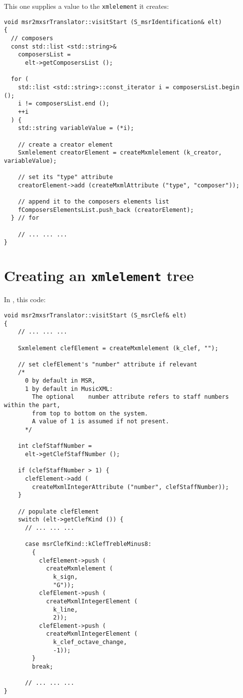This one supplies a value to the {\tt xmlelement} it creates:
\begin{lstlisting}[language=CPlusPlus]
void msr2mxsrTranslator::visitStart (S_msrIdentification& elt)
{
  // composers
  const std::list <std::string>&
    composersList =
      elt->getComposersList ();

  for (
    std::list <std::string>::const_iterator i = composersList.begin ();
    i != composersList.end ();
    ++i
  ) {
    std::string variableValue = (*i);

    // create a creator element
    Sxmlelement creatorElement = createMxmlelement (k_creator, variableValue);

    // set its "type" attribute
    creatorElement->add (createMxmlAttribute ("type", "composer"));

    // append it to the composers elements list
    fComposersElementsList.push_back (creatorElement);
  } // for

	// ... ... ...
}
\end{lstlisting}


\section{Creating an {\tt xmlelement} tree}

In {\tt }, this code:
\begin{lstlisting}[language=CPlusPlus]
void msr2mxsrTranslator::visitStart (S_msrClef& elt)
{
    // ... ... ...

    Sxmlelement clefElement = createMxmlelement (k_clef, "");

    // set clefElement's "number" attribute if relevant
    /*
      0 by default in MSR,
      1 by default in MusicXML:
        The optional	number attribute refers to staff numbers within the part,
        from top to bottom on the system.
        A value of 1 is assumed if not present.
	  */

    int clefStaffNumber =
      elt->getClefStaffNumber ();

    if (clefStaffNumber > 1) {
      clefElement->add (
        createMxmlIntegerAttribute ("number", clefStaffNumber));
    }

    // populate clefElement
    switch (elt->getClefKind ()) {
      // ... ... ...

      case msrClefKind::kClefTrebleMinus8:
        {
          clefElement->push (
            createMxmlelement (
              k_sign,
              "G"));
          clefElement->push (
            createMxmlIntegerElement (
              k_line,
              2));
          clefElement->push (
            createMxmlIntegerElement (
              k_clef_octave_change,
              -1));
        }
        break;

      // ... ... ...
}
\end{lstlisting}

